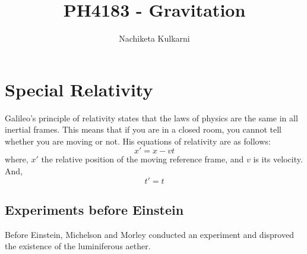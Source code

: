 \documentclass[12pt, oneside]{book}
\date{}
\title{PH4183 - Gravitation}
\author{Nachiketa Kulkarni}
\begin{document}
\maketitle
\tableofcontents

\mainmatter
{}
\chapter{Special Relativity}
Galileo's principle of relativity states that the laws of physics are the same in all inertial frames. This means that if you are in a closed room, you cannot tell whether you are moving or not.
His equations of relativity are as follows:
\[x' = x - vt\]
where, \(x'\) the relative position of the moving reference frame, and \(v\) is its velocity.
And,
\[t' = t\]
\section{Experiments before Einstein}
Before Einstein, Michelson and Morley conducted an experiment and disproved the existence of the luminiferous aether.
\end{document}
